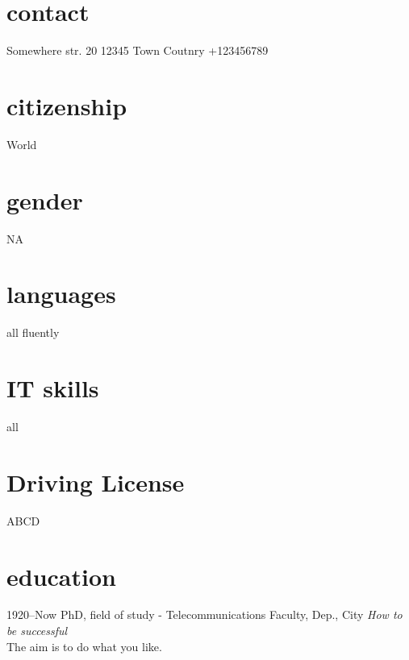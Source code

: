 \documentclass[]{friggeri-cv} %
\begin{document}

\begin{aside} %
\section{contact}
Somewhere str. 20
12345 Town
Coutnry
+123456789 \faMobilePhone
\section{citizenship}
World
\section{gender}
NA
\section{languages}
all fluently
\section{IT skills}
all
\section{Driving License}
ABCD
\end{aside}
\section{education}
\begin{entrylist}

\entry
{1920--Now}
{PhD, field of study - Telecommunications}
{Faculty, Dep., City}
{\emph{How to be successful}\\ The aim is to do what you like.}
\end{entrylist}

\end{document}
